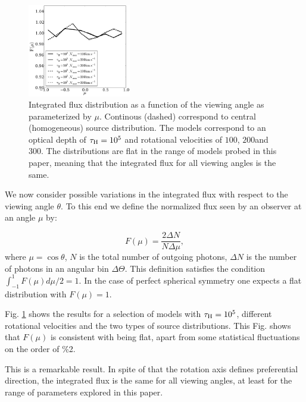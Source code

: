 \documentclass{emulateapj}
\newcommand{\kms}{{\ifmmode{{\mathrm{\,km\ s}^{-1}}}\else{\,km~s$^{-1}$}\fi}}
\begin{document}
\begin{figure}
\begin{center}
  \includegraphics[width=0.4\textwidth]{f5.pdf}
\end{center}
\caption{Integrated flux distribution as a function of the
  viewing angle as parameterized by $\mu$. Continous (dashed)
  correspond to central (homogeneous) source distribution.
  The models correspond to an optical depth of $\tau_{\rm
    H}=10^5$ and rotational velocities of $100$\kms, $200$\kms and
  $300$\kms. The distributions are flat in the range of models probed
  in this paper, meaning that the integrated flux for all viewing
  angles is the same.
\label{fig:muhisto}} 
\end{figure}

We now consider possible variations in the integrated flux with
respect to the viewing angle $\theta$. 
To this end we  define the normalized flux seen by an observer at an
angle $\mu$ by:  


\begin{equation}
F(\mu) = \frac{2\Delta N}{N\Delta \mu}, 
\end{equation} 
%
where $\mu=\cos\theta$, $N$ is the total number of outgoing photons,
$\Delta N$ is the number of photons in an angular bin $\Delta
\Theta$. This definition satisfies the condition
$\int_{-1}^{1}F(\mu)d\mu/2=1$.  In the case of perfect spherical
symmetry one expects a flat distribution with $F(\mu)=1$.

Fig. \ref{fig:muhisto} shows the results for a selection of models
with $\tau_{\rm H}=10^{5}$, different rotational velocities and the two
types of source distributions.
This Fig. shows that $F(\mu)$ is consistent with being flat, apart
from some statistical fluctuations on the order of \%2. 


This is a remarkable result. 
In spite of that the rotation axis defines preferential direction, the
integrated flux is the same for all viewing angles, at least for the
range of parameters explored in this paper. 
\end{document}
